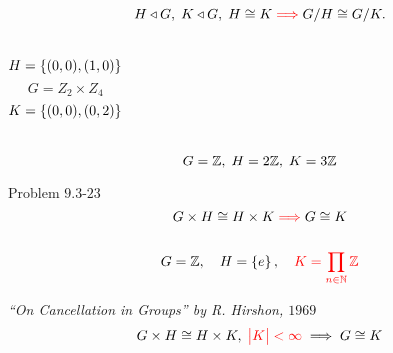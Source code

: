 
\begin{frame}

  \begin{center}
	\large{\it {}}
  \end{center}
\end{frame}

\begin{frame}
  \begin{exampleblock}{}
    \[
      H \triangleleft G,\; K \triangleleft G,\; H \cong K \textcolor{red}{\implies} G/H \cong G/K.
    \]
  \end{exampleblock}

  \pause
  \vspace{0.50cm}

  \pause
  \vspace{-0.50cm}
  \begin{columns}
	  \[
		H = \left\{(0,0), (1,0)\right\}
	  \]
	  \vspace{-0.40cm}
	  \[
		G = Z_2 \times Z_4
	  \]
	  \[
		K = \left\{(0,0), (0,2)\right\}
	  \]
  \end{columns}

  \pause
  \vspace{0.50cm}
  \[
	G = \mathbb{Z},\; H = 2\mathbb{Z},\; K = 3\mathbb{Z}
  \]
\end{frame}

\begin{frame}
  \begin{exampleblock}{Problem $9.3$-$23$}
	\[
	  G \times H \cong H \times K \textcolor{red}{\implies} G \cong K
	\]
  \end{exampleblock}

  \begin{columns}
	  \pause
	  \pause
  \end{columns}

  \pause
  \vspace{0.60cm}
  \[
	G = \mathbb{Z},\quad H = \left\{e\right\},\quad \textcolor{red}{K = \prod_{n \in \mathbb{N}} \mathbb{Z}}
  \]

  \pause
  \begin{alertblock}{\it ``On Cancellation in Groups'' by R. Hirshon, $1969$}
	\[
	  G \times H \cong H \times K,\; \textcolor{red}{\big\lvert K \big\rvert < \infty} \implies G \cong K
	\]
  \end{alertblock}
\end{frame}

